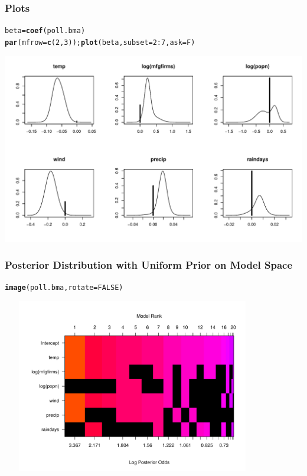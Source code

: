 \documentclass[]{beamer}\usepackage[]{graphicx}\usepackage[]{color}
\makeatletter
\newcommand{\hlnum}[1]{\textcolor[rgb]{0.686,0.059,0.569}{#1}}%
\newcommand{\hlopt}[1]{\textcolor[rgb]{0,0,0}{#1}}%
\newcommand{\hlstd}[1]{\textcolor[rgb]{0.345,0.345,0.345}{#1}}%
\newcommand{\hlkwb}[1]{\textcolor[rgb]{0.69,0.353,0.396}{#1}}%
\newcommand{\hlkwc}[1]{\textcolor[rgb]{0.333,0.667,0.333}{#1}}%
\newcommand{\hlkwd}[1]{\textcolor[rgb]{0.737,0.353,0.396}{\textbf{#1}}}%
\newenvironment{kframe}{%
 \def\at@end@of@kframe{}%
 \ifinner\ifhmode%
  \def\at@end@of@kframe{\end{minipage}}%
  \begin{minipage}{\columnwidth}%
 \fi\fi%
 \def\FrameCommand##1{\hskip\@totalleftmargin \hskip-\fboxsep
 \colorbox{shadecolor}{##1}\hskip-\fboxsep
     \hskip-\linewidth \hskip-\@totalleftmargin \hskip\columnwidth}%
 \MakeFramed {\advance\hsize-\width
   \@totalleftmargin\z@ \linewidth\hsize
   \@setminipage}}%
 {\par\unskip\endMakeFramed%
 \at@end@of@kframe}
\newenvironment{knitrout}{}{} %
\makeatother
\begin{document}
\begin{frame}[fragile]\frametitle{Plots}

\centering
\begin{knitrout}
\color{fgcolor}\begin{kframe}
\begin{alltt}
 \hlstd{beta} \hlkwb{=} \hlkwd{coef}\hlstd{(poll.bma)}
 \hlkwd{par}\hlstd{(}\hlkwc{mfrow}\hlstd{=}\hlkwd{c}\hlstd{(}\hlnum{2}\hlstd{,}\hlnum{3}\hlstd{));}  \hlkwd{plot}\hlstd{(beta,} \hlkwc{subset}\hlstd{=}\hlnum{2}\hlopt{:}\hlnum{7}\hlstd{,}\hlkwc{ask}\hlstd{=F)}
\end{alltt}
\end{kframe}
\includegraphics[width=0.75\linewidth,height=0.75\textheight]{figure/coef_plot-1} 
\end{knitrout}
\end{frame}

\begin{frame}\frametitle{Posterior Distribution  with Uniform Prior on Model Space}


\begin{knitrout}
\color{fgcolor}\begin{kframe}
\begin{alltt}
\hlkwd{image}\hlstd{(poll.bma,} \hlkwc{rotate}\hlstd{=}\hlnum{FALSE}\hlstd{)}
\end{alltt}
\end{kframe}
\includegraphics[width=4.5in,height=3in]{figure/unnamed-chunk-3-1} 
\end{knitrout}


\end{frame}
\end{document}
